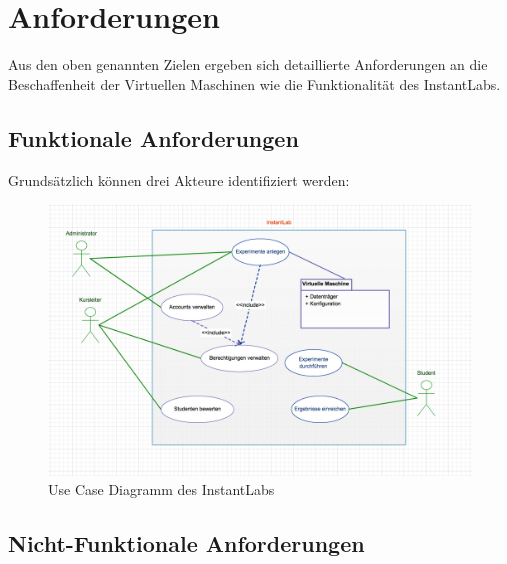 \section{Anforderungen}
\label{sec:requirements}

		Aus den oben genannten Zielen ergeben sich detaillierte Anforderungen an die Beschaffenheit der Virtuellen Maschinen wie die Funktionalität des InstantLabs.

		\subsection{Funktionale Anforderungen}


		Grundsätzlich können drei Akteure identifiziert werden:



			\begin{figure}[h]
				\begin{center}
					\includegraphics[width=\textwidth]{img/usecases}
					\caption{Use Case Diagramm des InstantLabs}
					\label{fig:instantlab-usecases}
				\end{center}
			\end{figure}


		\subsection{Nicht-Funktionale Anforderungen}

